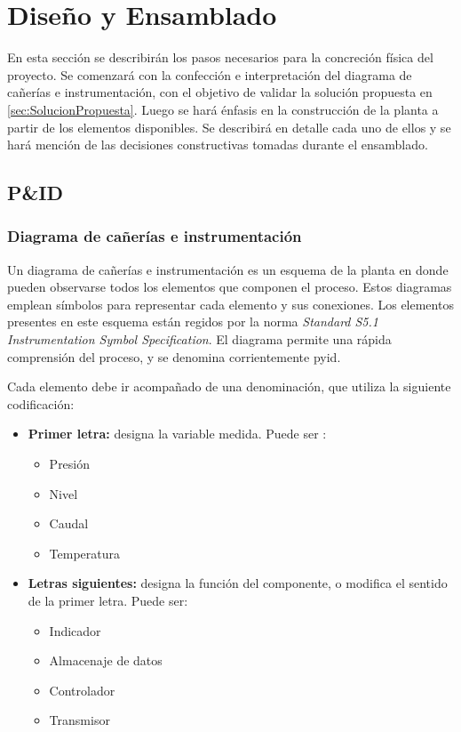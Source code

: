 \chapter{Diseño y Ensamblado}
\label{ch:DisenoEnsamblado}

En esta sección se describirán los pasos necesarios para la concreción física
del proyecto.
Se comenzará con la confección e interpretación del diagrama de cañerías e
instrumentación, con el objetivo de validar la solución propuesta en
\ref{sec:SolucionPropuesta}.
Luego se hará énfasis en la construcción de la planta a partir de los elementos
disponibles.
Se describirá en detalle cada uno de ellos y se hará mención de
las decisiones constructivas tomadas durante el ensamblado.

\section{P\&ID}
\label{sec:p&id}

\subsection{Diagrama de cañerías e instrumentación}
Un diagrama de cañerías e instrumentación es un esquema de la planta en donde
pueden observarse todos los elementos que componen el proceso.
Estos diagramas emplean símbolos para representar cada elemento y sus
conexiones.
Los elementos presentes en este esquema están regidos por la norma
\emph{Standard S5.1 Instrumentation Symbol Specification}.
El diagrama permite una rápida comprensión del proceso, y se denomina
corrientemente \gls{pyid}.

Cada elemento debe ir acompañado de una denominación, que utiliza la
siguiente codificación:

\begin{itemize}  
 \item \textbf{Primer letra:}
 designa la variable medida. Puede ser :
 \begin{itemize}
  \item Presión
  \item Nivel
  \item Caudal
  \item Temperatura
 \end{itemize}

 \item \textbf{Letras siguientes:}
 designa la función del componente, o modifica el sentido de la primer letra.
 Puede ser:
 \begin{itemize}
  \item Indicador
  \item Almacenaje de datos
  \item Controlador
  \item Transmisor
 \end{itemize}
\end{itemize}

